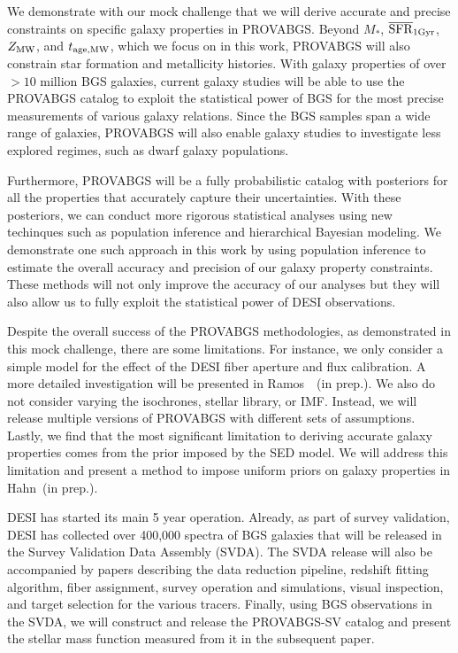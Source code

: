 We demonstrate with our mock challenge that we will derive accurate and precise
constraints on specific galaxy properties in PROVABGS. 
Beyond $M_*$, $\overline{\rm SFR}_{\rm 1Gyr}$, $Z_{\rm MW}$, and $t_{\rm age, MW}$, which we focus on in this work, 
PROVABGS will also constrain star formation and metallicity histories. 
With galaxy properties of over ${>}10$ million BGS galaxies, current galaxy
studies will be able to use the PROVABGS catalog to exploit the statistical
power of BGS for the most precise measurements of various galaxy relations.
Since the BGS samples span a wide range of galaxies, PROVABGS will
also enable galaxy studies to investigate less explored regimes, such as dwarf
galaxy populations. 

Furthermore, PROVABGS will be a fully probabilistic catalog with posteriors for all the
properties that accurately capture their uncertainties.
With these posteriors, we can conduct more rigorous statistical analyses
using new techinques such as population inference and hierarchical Bayesian
modeling.
We demonstrate one such approach in this work by using population inference to
estimate the overall accuracy and precision of our galaxy property constraints. 
These methods will not only improve the accuracy of our analyses but they will
also allow us to fully exploit the statistical power of DESI observations. 

Despite the overall success of the PROVABGS methodologies, as demonstrated in
this mock challenge, there are some limitations. 
For instance, we only consider a simple model for the effect of the DESI fiber
aperture and flux calibration. 
A more detailed investigation will be presented in Ramos~\etal~(in prep.). 
We also do not consider varying the isochrones, stellar library, or IMF. 
Instead, we will release multiple versions of PROVABGS with different sets of
assumptions. 
Lastly, we find that the most significant limitation to deriving accurate
galaxy properties comes from the prior imposed by the SED model. 
We will address this limitation and present a method to impose uniform priors
on galaxy properties in Hahn~(in prep.). 

DESI has started its main 5 year operation. 
Already, as part of survey validation, DESI has collected over 400,000 spectra
of BGS galaxies that will be released in the Survey Validation Data Assembly
(SVDA). 
The SVDA release will also be accompanied by papers describing the data
reduction pipeline, redshift fitting algorithm, fiber assignment, survey
operation and simulations, visual inspection, and target selection for the
various tracers. 
Finally, using BGS observations in the SVDA, we will construct and release the
PROVABGS-SV catalog and present the stellar mass function measured from it in
the subsequent paper. 
